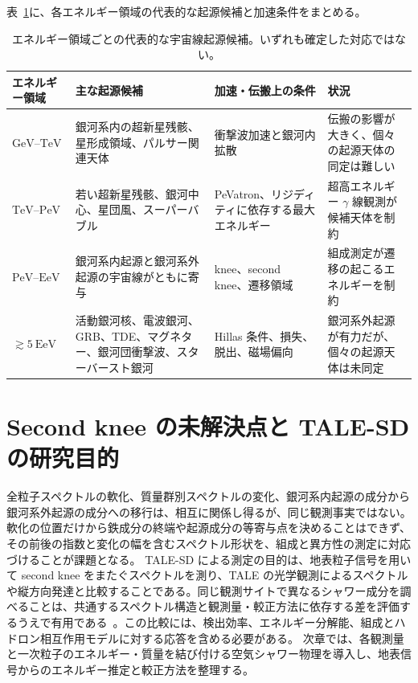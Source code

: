 \documentclass[book,paper=a4,fontsize=11pt]{jlreq}
\begin{document}
表~\ref{tab:source_by_energy}に、各エネルギー領域の代表的な起源候補と加速条件をまとめる。
\begin{table}[htb]
  \centering
  \small
  \caption{エネルギー領域ごとの代表的な宇宙線起源候補。いずれも確定した対応ではない。}
  \label{tab:source_by_energy}
  \begin{tabular}{@{}p{0.20\hsize}p{0.28\hsize}p{0.25\hsize}p{0.18\hsize}@{}}
    \hline
    エネルギー領域 & 主な起源候補 & 加速・伝搬上の条件 & 状況 \\
    \hline
    \(\mathrm{GeV}\)--\(\mathrm{TeV}\) & 銀河系内の超新星残骸、星形成領域、パルサー関連天体 & 衝撃波加速と銀河内拡散 & 伝搬の影響が大きく、個々の起源天体の同定は難しい \\
    \(\mathrm{TeV}\)--\(\mathrm{PeV}\) & 若い超新星残骸、銀河中心、星団風、スーパーバブル & PeVatron、リジディティに依存する最大エネルギー & 超高エネルギー \(\gamma\) 線観測が候補天体を制約 \\
    \(\mathrm{PeV}\)--\(\mathrm{EeV}\) & 銀河系内起源と銀河系外起源の宇宙線がともに寄与 & knee、second knee、遷移領域 & 組成測定が遷移の起こるエネルギーを制約 \\
    \(\gtrsim 5\ \mathrm{EeV}\) & 活動銀河核、電波銀河、GRB、TDE、マグネター、銀河団衝撃波、スターバースト銀河 & Hillas 条件、損失、脱出、磁場偏向 & 銀河系外起源が有力だが、個々の起源天体は未同定 \\
    \hline
  \end{tabular}
\end{table}

\FloatBarrier
\section{Second knee の未解決点と TALE-SD の研究目的}\label{sec:thesis_motivation}
全粒子スペクトルの軟化、質量群別スペクトルの変化、銀河系内起源の成分から銀河系外起源の成分への移行は、相互に関係し得るが、同じ観測事実ではない。軟化の位置だけから鉄成分の終端や起源成分の等寄与点を決めることはできず、その前後の指数と変化の幅を含むスペクトル形状を、組成と異方性の測定に対応づけることが課題となる。
TALE-SD による測定の目的は、地表粒子信号を用いて second knee をまたぐスペクトルを測り、TALE の光学観測によるスペクトルや縦方向発達と比較することである。同じ観測サイトで異なるシャワー成分を調べることは、共通するスペクトル構造と観測量・較正方法に依存する差を評価するうえで有用である~\cite{TALESpectrum2018,TALEMassComposition2026}。この比較には、検出効率、エネルギー分解能、組成とハドロン相互作用モデルに対する応答を含める必要がある。
次章では、各観測量と一次粒子のエネルギー・質量を結び付ける空気シャワー物理を導入し、地表信号からのエネルギー推定と較正方法を整理する。
\end{document}
